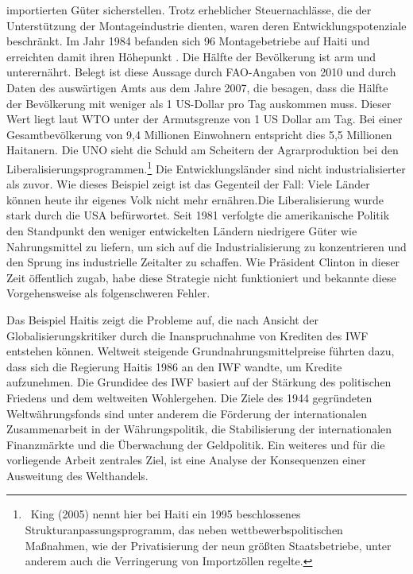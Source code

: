 importierten G{\"u}ter sicherstellen. Trotz erheblicher Steuernachl{\"a}sse, die der Unterst{\"u}tzung der Montageindustrie dienten, waren deren Entwicklungspotenziale beschr{\"a}nkt. Im Jahr 1984 befanden sich 96 Montagebetriebe auf Haiti und erreichten damit ihren H{\"o}hepunkt \citep{King.2005}. \newline Die H{\"a}lfte der Bev{\"o}lkerung ist arm und unterern{\"a}hrt. Belegt ist diese Aussage durch FAO-Angaben von 2010 und durch Daten des ausw{\"a}rtigen Amts aus dem Jahre 2007, die besagen, dass die H{\"a}lfte der Bev{\"o}lkerung mit weniger als 1 US-Dollar pro Tag auskommen muss. Dieser Wert liegt laut WTO unter der Armutsgrenze von 1 US Dollar am Tag. Bei einer Gesamtbevölkerung von 9,4 Millionen Einwohnern entspricht dies 5,5 Millionen Haitanern.  \newline Die UNO sieht die Schuld  am Scheitern der Agrarproduktion bei den Liberalisierungsprogrammen.\footnote{~King (2005) nennt hier bei Haiti ein 1995 beschlossenes Strukturanpassungsprogramm, das neben wettbewerbspolitischen Ma{\ss}nahmen, wie der Privatisierung der neun grö{\ss}ten Staatsbetriebe, unter anderem auch die Verringerung von Importzöllen regelte.} Die Entwicklungsländer sind nicht industrialisierter als zuvor. Wie dieses Beispiel zeigt ist das Gegenteil der Fall: Viele Länder können heute ihr eigenes Volk nicht mehr ernähren.\newline Die Liberalisierung wurde stark durch die USA befürwortet. Seit 1981 verfolgte die amerikanische Politik den Standpunkt den weniger entwickelten Ländern niedrigere Güter wie Nahrungsmittel zu liefern, um sich auf die Industrialisierung zu konzentrieren und den Sprung ins industrielle Zeitalter zu schaffen.  Wie Präsident Clinton in dieser Zeit öffentlich zugab, habe diese Strategie nicht funktioniert und bekannte diese Vorgehensweise als folgenschweren Fehler.\newline


Das Beispiel Haitis zeigt die Probleme auf, die nach Ansicht der Globalisierungskritiker durch die Inanspruchnahme von Krediten des IWF entstehen k{\"o}nnen. \newline Weltweit steigende Grundnahrungsmittelpreise f{\"u}hrten dazu, dass sich die Regierung Haitis 1986 an den IWF wandte, um Kredite aufzunehmen. Die Grundidee des IWF basiert auf der St{\"a}rkung des politischen Friedens und dem weltweiten Wohlergehen. Die Ziele des 1944 gegr{\"u}ndeten Weltw{\"a}hrungsfonds sind unter anderem die F{\"o}rderung der internationalen Zusammenarbeit in der W{\"a}hrungspolitik, die Stabilisierung der internationalen Finanzm{\"a}rkte und die {\"U}berwachung der Geldpolitik.  Ein weiteres und f{\"u}r die vorliegende Arbeit zentrales Ziel, ist eine Analyse der Konsequenzen einer Ausweitung des Welthandels.


